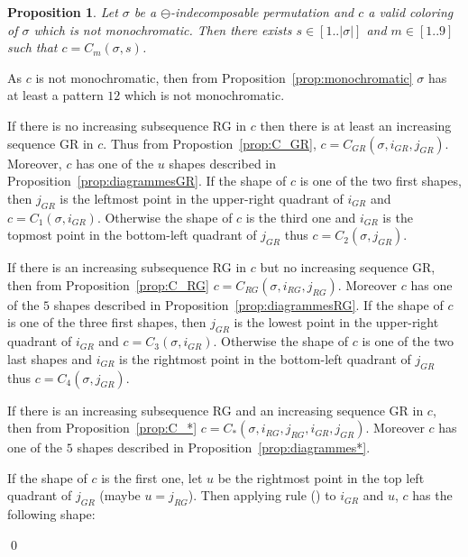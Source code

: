 \documentclass[11pt]{article}
\newenvironment{pf}{{\em \noindent Proof:}}{ \hfill \qed\smallskip}
\newcommand{\rmnum}[1]{\romannumeral #1}
\newtheorem{prop}[thm]{Proposition}
\begin{document}
\begin{prop}\label{prop:valid=C_numero}
Let $\sigma$ be a $\ominus$-indecomposable permutation and $c$ a valid coloring of $\sigma$ which is not monochromatic.
Then there exists $s \in [1..|\sigma|]$ and $m \in [1..9]$ such that $c = C_m(\sigma, s)$.
\end{prop}

\begin{pf}
As $c$ is not monochromatic, then from Proposition~\ref{prop:monochromatic} $\sigma$ has at least a pattern $12$ which is not monochromatic.

If there is no increasing subsequence RG in $c$ then there is at least an increasing sequence GR in $c$. 
Thus from Propostion~\ref{prop:C_GR}, $c = C_{GR}(\sigma, i_{GR}, j_{GR})$. 
Moreover, $c$ has one of the $u$ shapes described in Proposition~\ref{prop:diagrammesGR}.
If the shape of $c$ is one of the two first shapes, then $j_{GR}$ is the leftmost point in the upper-right quadrant of $i_{GR}$
and $c = C_1(\sigma, i_{GR})$.
Otherwise the shape of $c$ is the third one and $i_{GR}$ is the topmost point in the bottom-left quadrant of $j_{GR}$
thus $c = C_2(\sigma, j_{GR})$.

If there is an increasing subsequence RG in $c$ but no increasing sequence GR, 
then from Proposition~\ref{prop:C_RG} $c = C_{RG}(\sigma, i_{RG}, j_{RG})$.
Moreover $c$ has one of the $5$ shapes described in Proposition~\ref{prop:diagrammesRG}.
If the shape of $c$ is one of the three first shapes, then $j_{GR}$ is the lowest point in the upper-right quadrant of $i_{GR}$
and $c = C_3(\sigma, i_{GR})$.
Otherwise the shape of $c$ is one of the two last shapes and $i_{GR}$ is the rightmost point in the bottom-left quadrant of $j_{GR}$
thus $c = C_4(\sigma, j_{GR})$.

If there is an increasing subsequence RG and an increasing sequence GR in $c$, 
then from Proposition~\ref{prop:C_*} $c = C_*(\sigma, i_{RG}, j_{RG}, i_{GR}, j_{GR})$.
Moreover $c$ has one of the $5$ shapes described in Proposition~\ref{prop:diagrammes*}.

If the shape of $c$ is the first one, let $u$ be the rightmost point in the top left quadrant of $j_{GR}$ (maybe $u = j_{RG}$).
Then applying rule (\rmnum{2}) to $i_{GR}$ and $u$, $c$ has the following shape:


\end{pf}
\end{document}
